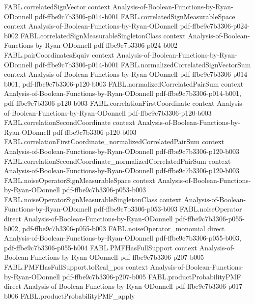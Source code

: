 \begin{theorem}
  {FABL.correlatedSignVector}
  {context}
  {Analysis-of-Boolean-Functions-by-Ryan-ODonnell}
  {pdf-ffbe9c7b3306-p014-b001}
\proofstep
  {FABL.correlatedSignMeasurableSpace}
  {context}
  {Analysis-of-Boolean-Functions-by-Ryan-ODonnell}
  {pdf-ffbe9c7b3306-p024-b002}
\proofstep
  {FABL.correlatedSignMeasurableSingletonClass}
  {context}
  {Analysis-of-Boolean-Functions-by-Ryan-ODonnell}
  {pdf-ffbe9c7b3306-p024-b002}
\proofstep
  {FABL.pairCoordinatesEquiv}
  {context}
  {Analysis-of-Boolean-Functions-by-Ryan-ODonnell}
  {pdf-ffbe9c7b3306-p014-b001}
\proofstep
  {FABL.normalizedCorrelatedSignVectorSum}
  {context}
  {Analysis-of-Boolean-Functions-by-Ryan-ODonnell}
  {pdf-ffbe9c7b3306-p014-b001,
    pdf-ffbe9c7b3306-p120-b003}
\proofstep
  {FABL.normalizedCorrelatedPairSum}
  {context}
  {Analysis-of-Boolean-Functions-by-Ryan-ODonnell}
  {pdf-ffbe9c7b3306-p014-b001,
    pdf-ffbe9c7b3306-p120-b003}
\proofstep
  {FABL.correlationFirstCoordinate}
  {context}
  {Analysis-of-Boolean-Functions-by-Ryan-ODonnell}
  {pdf-ffbe9c7b3306-p120-b003}
\proofstep
  {FABL.correlationSecondCoordinate}
  {context}
  {Analysis-of-Boolean-Functions-by-Ryan-ODonnell}
  {pdf-ffbe9c7b3306-p120-b003}
\proofstep
  {FABL.correlationFirstCoordinate_normalizedCorrelatedPairSum}
  {context}
  {Analysis-of-Boolean-Functions-by-Ryan-ODonnell}
  {pdf-ffbe9c7b3306-p120-b003}
\proofstep
  {FABL.correlationSecondCoordinate_normalizedCorrelatedPairSum}
  {context}
  {Analysis-of-Boolean-Functions-by-Ryan-ODonnell}
  {pdf-ffbe9c7b3306-p120-b003}
\proofstep
  {FABL.noiseOperatorSignMeasurableSpace}
  {context}
  {Analysis-of-Boolean-Functions-by-Ryan-ODonnell}
  {pdf-ffbe9c7b3306-p053-b003}
\proofstep
  {FABL.noiseOperatorSignMeasurableSingletonClass}
  {context}
  {Analysis-of-Boolean-Functions-by-Ryan-ODonnell}
  {pdf-ffbe9c7b3306-p053-b003}
\proofstep
  {FABL.noiseOperator}
  {direct}
  {Analysis-of-Boolean-Functions-by-Ryan-ODonnell}
  {pdf-ffbe9c7b3306-p055-b002,
    pdf-ffbe9c7b3306-p055-b003}
\proofstep
  {FABL.noiseOperator_monomial}
  {direct}
  {Analysis-of-Boolean-Functions-by-Ryan-ODonnell}
  {pdf-ffbe9c7b3306-p055-b003,
    pdf-ffbe9c7b3306-p055-b004}
\proofstep
  {FABL.PMFHasFullSupport}
  {context}
  {Analysis-of-Boolean-Functions-by-Ryan-ODonnell}
  {pdf-ffbe9c7b3306-p207-b005}
\proofstep
  {FABL.PMFHasFullSupport.toReal_pos}
  {context}
  {Analysis-of-Boolean-Functions-by-Ryan-ODonnell}
  {pdf-ffbe9c7b3306-p207-b005}
\proofstep
  {FABL.productProbabilityPMF}
  {direct}
  {Analysis-of-Boolean-Functions-by-Ryan-ODonnell}
  {pdf-ffbe9c7b3306-p017-b006}
\proofstep
  {FABL.productProbabilityPMF_apply}

\end{theorem}
